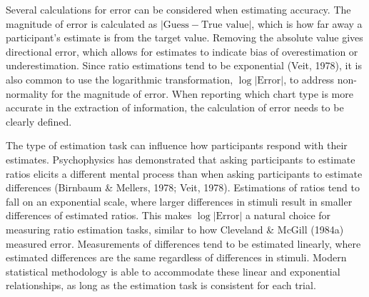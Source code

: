 \documentclass[phd]{nuthesis}
\begin{document}
Several calculations for error can be considered when estimating
accuracy. The magnitude of error is calculated as
\(|\text{Guess}-\text{True value}|\), which is how far away a
participant's estimate is from the target value. Removing the absolute
value gives directional error, which allows for estimates to indicate
bias of overestimation or underestimation. Since ratio estimations tend
to be exponential (Veit, 1978), it is also common to use the logarithmic
transformation, \(\log|\text{Error}|\), to address non-normality for the
magnitude of error. When reporting which chart type is more accurate in
the extraction of information, the calculation of error needs to be
clearly defined.

The type of estimation task can influence how participants respond with
their estimates. Psychophysics has demonstrated that asking participants
to estimate ratios elicits a different mental process than when asking
participants to estimate differences (Birnbaum \& Mellers, 1978; Veit,
1978). Estimations of ratios tend to fall on an exponential scale, where
larger differences in stimuli result in smaller differences of estimated
ratios. This makes \(\log|\text{Error}|\) a natural choice for measuring
ratio estimation tasks, similar to how Cleveland \& McGill (1984a)
measured error. Measurements of differences tend to be estimated
linearly, where estimated differences are the same regardless of
differences in stimuli. Modern statistical methodology is able to
accommodate these linear and exponential relationships, as long as the
estimation task is consistent for each trial.
\end{document}
